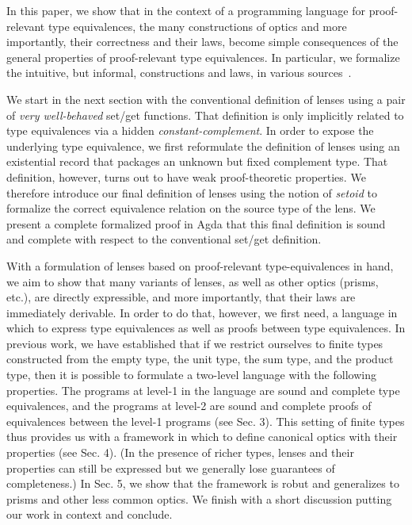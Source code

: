 \documentclass[sigplan,review,anonymous]{acmart}
\begin{document}
In this paper, we show that in the context of a programming language
for proof-relevant type equivalences, the many constructions of optics
and more importantly, their correctness and their laws, become simple
consequences of the general properties of proof-relevant type
equivalences. In particular, we formalize the intuitive, but informal,
constructions and laws, in various
sources~\cite{oleg-blog,Miltner:2017:SBL:3177123.3158089,laarhoven}.

We start in the next section with the conventional definition of
lenses using a pair of \emph{very well-behaved} set/get
functions. That definition is only implicitly related to type
equivalences via a hidden \emph{constant-complement}. In order to
expose the underlying type equivalence, we first reformulate the
definition of lenses using an existential record that packages an
unknown but fixed complement type. That definition, however, turns out
to have weak proof-theoretic properties. We therefore introduce our
final definition of lenses using the notion of \emph{setoid} to
formalize the correct equivalence relation on the source type of the
lens. We present a complete formalized proof in Agda that this final
definition is sound and complete with respect to the conventional
set/get definition.

With a formulation of lenses based on proof-relevant type-equivalences
in hand, we aim to show that many variants of lenses, as well as other
optics (prisms, etc.), are directly expressible, and more importantly,
that their laws are immediately derivable. In order to do that,
however, we first need, a language in which to express type
equivalences as well as proofs between type equivalences. In previous
work, we have established that if we restrict ourselves to finite
types constructed from the empty type, the unit type, the sum type,
and the product type, then it is possible to formulate a two-level
language with the following properties. The programs at level-1 in the
language are sound and complete type equivalences, and the programs at
level-2 are sound and complete proofs of equivalences between the
level-1 programs (see Sec. 3). This setting of finite types thus
provides us with a framework in which to define canonical optics with
their properties (see Sec. 4). (In the presence of richer types,
lenses and their properties can still be expressed but we generally
lose guarantees of completeness.) In Sec. 5, we show that the
framework is robut and generalizes to prisms and other less common
optics. We finish with a short discussion putting our work in context
and conclude.
\end{document}
